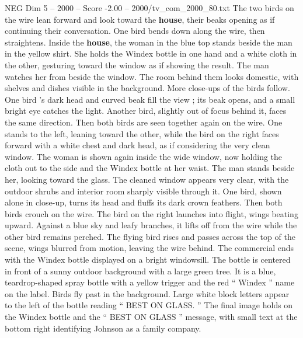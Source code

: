 \begin{textsample}{NEG Dim 5 – 2000 – Score -2.00 – 2000/tv\_com\_2000\_80.txt}
The two birds on the wire lean forward and look toward the \textbf{house}, their beaks opening as if continuing their conversation.
One bird bends down along the wire, then straightens.
Inside the \textbf{house}, the woman in the blue top stands beside the man in the yellow shirt.
She holds the Windex bottle in one hand and a white cloth in the other, gesturing toward the window as if showing the result.
The man watches her from beside the window.
The room behind them looks domestic, with shelves and dishes visible in the background.
More close-ups of the birds follow.
One bird ’s dark head and curved beak fill the view ; its beak opens, and a small bright eye catches the light.
Another bird, slightly out of focus behind it, faces the same direction.
Then both birds are seen together again on the wire.
One stands to the left, leaning toward the other, while the bird on the right faces forward with a white chest and dark head, as if considering the very clean window.
The woman is shown again inside the wide window, now holding the cloth out to the side and the Windex bottle at her waist.
The man stands beside her, looking toward the glass.
The cleaned window appears very clear, with the outdoor shrubs and interior room sharply visible through it.
One bird, shown alone in close-up, turns its head and fluffs its dark crown feathers.
Then both birds crouch on the wire.
The bird on the right launches into flight, wings beating upward.
Against a blue sky and leafy branches, it lifts off from the wire while the other bird remains perched.
The flying bird rises and passes across the top of the scene, wings blurred from motion, leaving the wire behind.
The commercial ends with the Windex bottle displayed on a bright windowsill.
The bottle is centered in front of a sunny outdoor background with a large green tree.
It is a blue, teardrop-shaped spray bottle with a yellow trigger and the red “ Windex ” name on the label.
Birds fly past in the background.
Large white block letters appear to the left of the bottle reading “ BEST ON GLASS. ” The final image holds on the Windex bottle and the “ BEST ON GLASS ” message, with small text at the bottom right identifying Johnson as a family company.

\end{textsample}
